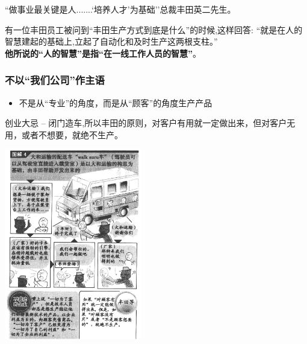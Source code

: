 \begin{description}
\tightlist
\item[]
``做事业最关键是人.......`培养人才'为基础''总裁丰田英二先生。
\end{description}

\begin{description}
\tightlist
\item[]
有一位丰田员工被问到``丰田生产方式到底是什么''的时候,这样回答:
``就是在人的智慧建起的基础上,立起了自动化和及时生产这两根支柱。''\\

\textbf{他所说的``人的智慧''是指``在一线工作人员的智慧''}。\\
\end{description}

\hypertarget{ux4e0dux4ee5ux6211ux4eecux516cux53f8ux4f5cux4e3bux8bed}{%
\subsubsection{不以``我们公司''作主语}\label{ux4e0dux4ee5ux6211ux4eecux516cux53f8ux4f5cux4e3bux8bed}}

\begin{itemize}
\tightlist
\item
  不是从``专业''的角度，而是从``顾客''的角度生产产品
\end{itemize}

\begin{description}
\tightlist
\item[]
创业大忌 --
闭门造车,所以丰田的原则，对客户有用就一定做出来，但对客户无用，或者不想要，就绝不生产。\\
\end{description}


\includegraphics[width=6cm]{丰田p3.png}

